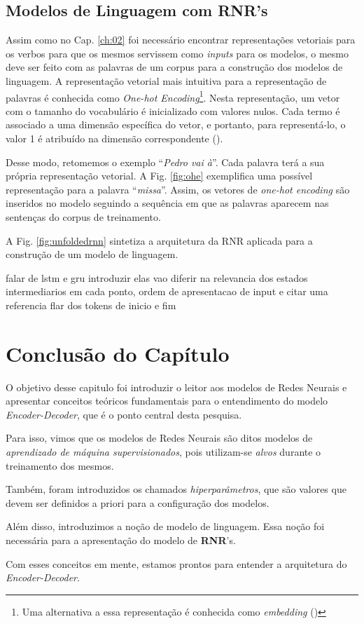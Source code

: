 \subsection{Modelos de Linguagem com RNR's}

Assim como no Cap. \ref{ch:02} foi necessário encontrar representações vetoriais para os verbos para que os mesmos servissem como \textit{inputs} para os modelos, o mesmo deve ser feito com as palavras de um corpus para a construção dos modelos de linguagem. A representação vetorial mais intuitiva para a representação de palavras é conhecida como \textit{One-hot Encoding}\footnote{Uma alternativa a essa representação é conhecida como \textit{embedding} (\cite{word2vec:2013})}. Nesta representação, um vetor com o tamanho do vocabulário é inicializado com valores nulos. Cada termo é associado a uma dimensão específica do vetor, e portanto, para representá-lo, o valor 1 é atribuído na dimensão correspondente (\cite{harris:2013}). 

Desse modo, retomemos o exemplo “\textit{Pedro vai à}”. Cada palavra terá a sua própria representação vetorial. A Fig. \ref{fig:ohe} exemplifica uma possível representação para a palavra “\textit{missa}”. Assim, os vetores de \textit{one-hot encoding} são inseridos no modelo seguindo a sequência em que as palavras aparecem nas sentenças do corpus de treinamento. 



A Fig. \ref{fig:unfoldedrnn} sintetiza a arquitetura da RNR aplicada para a construção de um modelo de linguagem.



falar de lstm e gru introduzir elas
vao diferir na relevancia dos estados intermediarios em cada ponto, ordem de apresentacao de input e citar uma referencia
flar dos tokens de inicio e fim

\section{Conclusão do Capítulo}

O objetivo desse capitulo foi introduzir o leitor aos modelos de Redes Neurais e apresentar conceitos teóricos fundamentais para o entendimento do modelo \textit{Encoder-Decoder}, que é o ponto central desta pesquisa.

Para isso, vimos que os modelos de Redes Neurais são ditos modelos de \textit{aprendizado de máquina supervisionados}, pois utilizam-se \textit{alvos} durante o treinamento dos mesmos.

Também, foram introduzidos os chamados \textit{hiperparâmetros}, que são valores que devem ser definidos a priori para a configuração dos modelos. 

Além disso, introduzimos a noção de modelo de linguagem. Essa noção foi necessária para a apresentação do modelo de \textbf{RNR}'s. 

Com esses conceitos em mente, estamos prontos para entender a arquitetura do \textit{Encoder-Decoder}.

